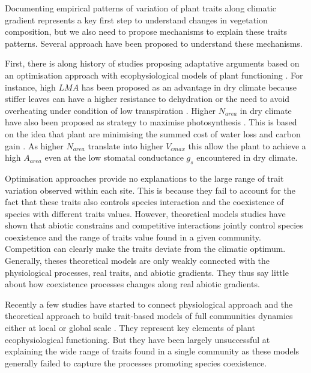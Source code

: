\documentclass[a4paper,11pt]{article}
\begin{document}
Documenting empirical patterns of variation of plant traits along
climatic gradient represents a key first step to understand changes in
vegetation composition, but we also need to propose mechanisms to
explain these traits patterns. Several approach have been proposed to
understand these mechanisms.


First, there is along history of studies
proposing adaptative arguments based on an optimisation approach with
ecophysiological models of plant functioning \citep{Makela-2002}. For instance, high $LMA$ has been proposed as an advantage in dry climate because
stiffer leaves can have a higher resistance to dehydration
\citep{Wright-2002a,Wright-2002b} or the need to avoid overheating
under condition of low transpiration \citep{Leigh-2012}. Higher
$N_{area}$ in dry climate have also been proposed as strategy to
maximise photosynthesis \citep{Wright-2003}. This is
based on the idea that plant are minimising the summed cost of water
loss and carbon gain
\citep{Medlyn-2002,Wright-2003,Prentice-2014,Lu-2016,Wang-2017,Dong-2017}. As
higher $N_{area}$ translate into higher $V_{cmax}$ this allow the
plant to achieve a high $A_{area}$ even at the low stomatal conductance
$g_s$ encountered in dry climate.

Optimisation approaches provide no explanations to the large range of trait variation observed
within each site. This is because they fail to account for the fact that
these traits also controls species interaction and the coexistence of
species with different traits values. 
However, theoretical models \citep{Case-2000,Goldberg-2006,Leimar-2008}
studies have shown that abiotic constrains and competitive interactions jointly control species coexistence \citep{Chesson-2018} and the range of traits
value found in a given community. Competition can clearly make the traits deviate from the climatic optimum.  Generally, theses theoretical models are only weakly connected with the physiological processes, real traits, and abiotic gradients. They thus say little about how coexistence processes changes along real abiotic gradients. 

Recently a few studies have started to connect physiological approach
and the theoretical approach to build trait-based models of full
communities dynamics either at local \citep{Farrior-2013} or global
scale \citep[see][]{Sakschewski-2015,Scheiter-2013}. They represent key elements of plant ecophysiological functioning. But they have been largely unsuccessful at explaining the wide range of traits found in a single community as these models generally failed to capture the processes promoting species coexistence.
\end{document}

